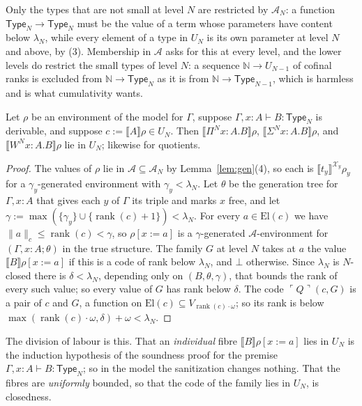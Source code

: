 \documentclass[10pt]{article}
\newcommand{\N}{\mathbb{N}}
\newcommand{\Type}{\mathsf{Type}}
\newcommand{\rk}{\operatorname{rank}}
\newcommand{\sem}[1]{\llbracket #1\rrbracket}
\newcommand{\El}{\mathrm{El}}
\newcommand{\code}[1]{\ulcorner #1\urcorner}
\newcommand{\X}{\mathcal{X}}
\newcommand{\A}{\mathcal{A}}
\begin{document}
Only the types that are not small at level $N$ are restricted by
$\A_N$: a function $\Type_N\to\Type_N$ must be the value of a term whose
parameters have content below $\lambda_N$, while every element of a type
in $U_N$ is its own parameter at level $N$ and above, by (3). Membership
in $\A$ asks for this at every level, and the lower levels do restrict
the small types of level $N$: a sequence $\N\to U_{N-1}$ of cofinal ranks
is excluded from $\N\to\Type_N$ as it is from $\N\to\Type_{N-1}$, which is
harmless and is what cumulativity wants.


\begin{lemma}\label{lem:tyform}
Let $\rho$ be an environment of the model for $\Gamma$, suppose
$\Gamma,x{:}A\vdash B:\Type_N$ is derivable, and suppose
$c:=\sem A\rho\in U_N$. Then $\sem{\Pi^Nx{:}A.B}\rho$,
$\sem{\Sigma^Nx{:}A.B}\rho$, and $\sem{W^Nx{:}A.B}\rho$ lie in $U_N$;
likewise for quotients.
\end{lemma}
\begin{proof}
The values of $\rho$ lie in $\A\subseteq\A_N$ by Lemma~\ref{lem:gen}(4),
so each is $\sem{t_y}^{\X_y}\rho_y$ for a $\gamma_y$-generated environment
with $\gamma_y<\lambda_N$. Let $\theta$ be the generation tree for
$\Gamma,x{:}A$ that gives each $y$ of $\Gamma$ its triple and marks $x$
free, and let $\gamma:=\max(\{\gamma_y\}\cup\{\rk(c)+1\})<\lambda_N$. For
every $a\in\El(c)$ we have $\|a\|_c\le\rk(c)<\gamma$, so $\rho[x{:=}a]$ is a
$\gamma$-generated $\A$-environment for $(\Gamma,x{:}A;\theta)$ in the true
structure. The family $G$ at level $N$ takes at $a$ the value
$\sem B\rho[x{:=}a]$ if this is a code of rank below $\lambda_N$, and
$\bot$ otherwise. Since $\lambda_N$ is $N$-closed there is
$\delta<\lambda_N$, depending only on $(B,\theta,\gamma)$, that bounds the
rank of every such value; so every value of $G$ has rank below $\delta$.
The code $\code Q(c,G)$ is a pair of $c$ and $G$, a function on
$\El(c)\subseteq V_{\rk(c)\cdot\omega}$; so its rank is below
$\max(\rk(c)\cdot\omega,\delta)+\omega<\lambda_N$.
\end{proof}

The division of labour is this. That an \emph{individual} fibre
$\sem B\rho[x{:=}a]$ lies in $U_N$ is the induction hypothesis of the
soundness proof for the premise $\Gamma,x{:}A\vdash B:\Type_N$; so in the
model the sanitization changes nothing. That the fibres are
\emph{uniformly} bounded, so that the code of the family lies in $U_N$,
is closedness.
\end{document}

